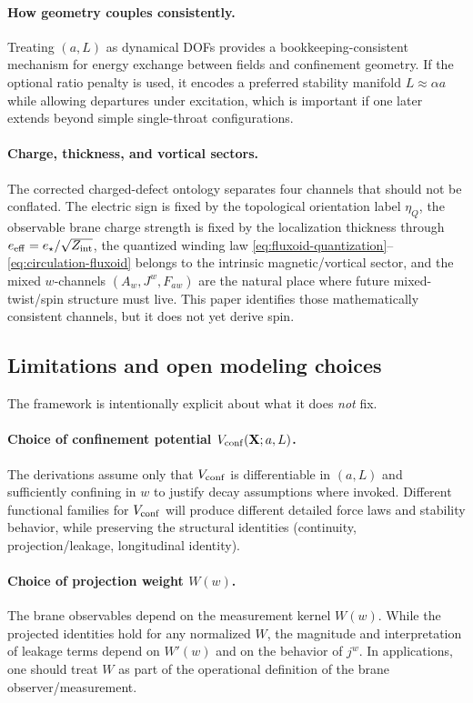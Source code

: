 \documentclass[11pt]{article}
\newcommand{\etaQ}{\eta_Q}
\newcommand{\estar}{e_\star}
\newcommand{\eeff}{e_{\rm eff}}
\newcommand{\Zint}{Z_{\rm int}}
\begin{document}
\paragraph{How geometry couples consistently.}
Treating $(a,L)$ as dynamical DOFs provides a bookkeeping-consistent mechanism for energy exchange between fields and confinement geometry. If the optional ratio penalty is used, it encodes a preferred stability manifold $L\approx \alpha a$ while allowing departures under excitation, which is important if one later extends beyond simple single-throat configurations.

\paragraph{Charge, thickness, and vortical sectors.}
The corrected charged-defect ontology separates four channels that should not be conflated. The electric sign is fixed by the topological orientation label $\etaQ$, the observable brane charge strength is fixed by the localization thickness through $\eeff=\estar/\sqrt{\Zint}$, the quantized winding law \eqref{eq:fluxoid-quantization}--\eqref{eq:circulation-fluxoid} belongs to the intrinsic magnetic/vortical sector, and the mixed $w$-channels $(A_w,J^w,F_{a w})$ are the natural place where future mixed-twist/spin structure must live. This paper identifies those mathematically consistent channels, but it does not yet derive spin.

\subsection{Limitations and open modeling choices}
\label{sec:discussion-limitations}

The framework is intentionally explicit about what it does \emph{not} fix.

\paragraph{Choice of confinement potential \texorpdfstring{$V_{\rm conf}(\mathbf{X};a,L)$}{V\_ conf(X;a,L)}.}
The derivations assume only that $V_{\rm conf}$ is differentiable in $(a,L)$ and sufficiently confining in $w$ to justify decay assumptions where invoked. Different functional families for $V_{\rm conf}$ will produce different detailed force laws and stability behavior, while preserving the structural identities (continuity, projection/leakage, longitudinal identity).

\paragraph{Choice of projection weight \texorpdfstring{$W(w)$}{W(w)}.}
The brane observables depend on the measurement kernel $W(w)$. While the projected identities hold for any normalized $W$, the magnitude and interpretation of leakage terms depend on $W'(w)$ and on the behavior of $j^w$. In applications, one should treat $W$ as part of the operational definition of the brane observer/measurement.
\end{document}
